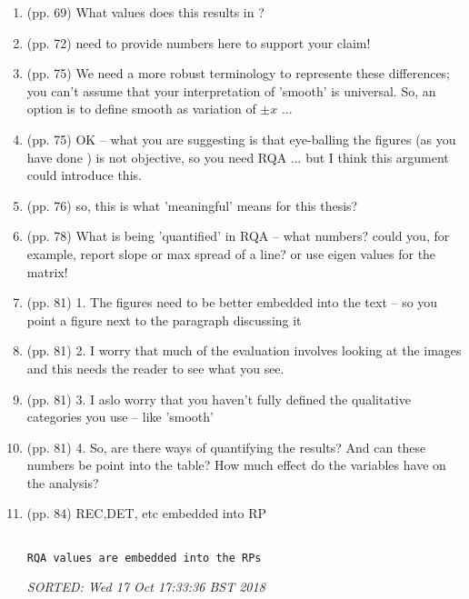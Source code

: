 \documentclass[10pt]{article}
\begin{document}
\begin{enumerate}




\item (pp. 69) What values does this results in ?

\item (pp. 72) need to provide numbers here to support your claim!

\item (pp. 75) We need a more robust terminology to represente these
	differences; you can't assume that your interpretation of
	'smooth' is universal. So, an option is to define smooth as
	variation of $\pm x$ ...

\item (pp. 75) OK -- what you are suggesting is that eye-balling 
	the figures (as you have done ) is not objective, 
	so you need RQA ... but I think this argument could introduce
	this.

\item (pp. 76) so, this is what 'meaningful' means for this thesis?

\item (pp. 78) What is being 'quantified' in RQA --
	what numbers? could you, for example, report slope or
	max spread of a line? or use eigen values for the matrix!
	
\item (pp. 81) 1. The figures need to be better embedded into the 
	text -- so you point a figure next to the paragraph discussing it

 	
\item (pp. 81) 2. I worry that much of the evaluation involves looking 
	at the images and this needs the reader to see what you see.


\item (pp. 81) 3. I aslo worry that you haven't fully defined the 
	qualitative categories you use -- like 'smooth'

\item (pp. 81) 4. So, are there ways of quantifying the results?
	And can these numbers be point into the table?
	How much effect do the variables have on the analysis?

\item (pp. 84) REC,DET, etc embedded into RP
 

\begin{verbatim}

RQA values are embedded into the RPs

\end{verbatim}
\textit{
SORTED: 
Wed 17 Oct 17:33:36 BST 2018
}
\\






\end{enumerate}
\end{document}
